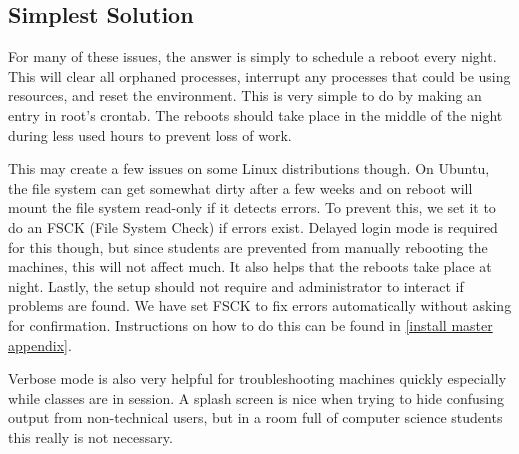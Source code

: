 \subsection{Simplest Solution}
For many of these issues, the answer is simply to schedule a reboot every night.  This will clear all orphaned processes, interrupt any processes that could be using resources, and reset the environment.  This is very simple to do by making an entry in root's crontab.  The reboots should take place in the middle of the night during less used hours to prevent loss of work.  

This may create a few issues on some Linux distributions though.  On Ubuntu, the file system can get somewhat dirty after a few weeks and on reboot will mount the file system read-only if it detects errors.  To prevent this, we set it to do an FSCK (File System Check) if errors exist.  Delayed login mode is required for this though, but since students are prevented from manually rebooting the machines, this will not affect much.  It also helps that the reboots take place at night.  Lastly, the setup should not require and administrator to interact if problems are found.  We have set FSCK to fix errors automatically without asking for confirmation.  Instructions on how to do this can be found in \ref{install master appendix}.

Verbose mode is also very helpful for troubleshooting machines quickly especially while classes are in session.  A splash screen is nice when trying to hide confusing output from non-technical users, but in a room full of computer science students this really is not necessary.  
